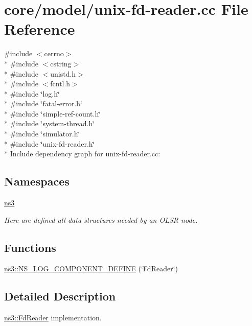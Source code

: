 \hypertarget{unix-fd-reader_8cc}{}\section{core/model/unix-\/fd-\/reader.cc File Reference}
\label{unix-fd-reader_8cc}
{\ttfamily \#include $<$cerrno$>$}\\*
{\ttfamily \#include $<$cstring$>$}\\*
{\ttfamily \#include $<$unistd.\+h$>$}\\*
{\ttfamily \#include $<$fcntl.\+h$>$}\\*
{\ttfamily \#include \char`\"{}log.\+h\char`\"{}}\\*
{\ttfamily \#include \char`\"{}fatal-\/error.\+h\char`\"{}}\\*
{\ttfamily \#include \char`\"{}simple-\/ref-\/count.\+h\char`\"{}}\\*
{\ttfamily \#include \char`\"{}system-\/thread.\+h\char`\"{}}\\*
{\ttfamily \#include \char`\"{}simulator.\+h\char`\"{}}\\*
{\ttfamily \#include \char`\"{}unix-\/fd-\/reader.\+h\char`\"{}}\\*
Include dependency graph for unix-\/fd-\/reader.cc\+:
\subsection*{Namespaces}
\begin{DoxyCompactItemize}
\item 
 \hyperlink{namespacens3}{ns3}
\begin{DoxyCompactList}\small\item\em Here are defined all data structures needed by an O\+L\+SR node. \end{DoxyCompactList}\end{DoxyCompactItemize}
\subsection*{Functions}
\begin{DoxyCompactItemize}
\item 
\hyperlink{namespacens3_a8d809fcb15c5750dd0ac57fb053e867b}{ns3\+::\+N\+S\+\_\+\+L\+O\+G\+\_\+\+C\+O\+M\+P\+O\+N\+E\+N\+T\+\_\+\+D\+E\+F\+I\+NE} (\char`\"{}Fd\+Reader\char`\"{})
\end{DoxyCompactItemize}


\subsection{Detailed Description}
\hyperlink{classns3_1_1FdReader}{ns3\+::\+Fd\+Reader} implementation. 